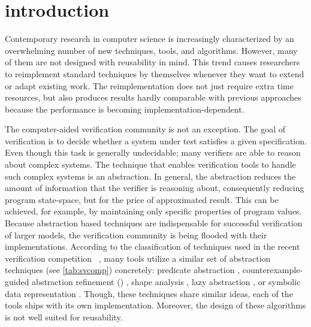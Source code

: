 \chapter{introduction}
\label{ch:intro}


Contemporary research in computer science is increasingly characterized by
an overwhelming number of new techniques, tools, and algorithms.  However, many
of them are not designed with reusability in mind.  This trend causes
researchers to reimplement standard techniques by themselves whenever they want
to extend or adapt existing work.  The reimplementation does not just require
extra time resources, but also produces results hardly comparable with previous
approaches because the performance is becoming implementation-dependent.

The computer-aided verification community is not an exception. The goal of
verification is to decide whether a system under test satisfies a given
specification. Even though this task is generally undecidable; many verifiers
are able to reason about complex systems. The technique that enables
verification tools to handle such complex systems is an abstraction. In
general, the abstraction reduces the amount of information that the verifier is
reasoning about, consequently reducing program state-space, but for the price
of approximated result. This can be achieved, for example, by maintaining only
specific properties of program values. Because abstraction based techniques are
indispensable for successful verification of larger models, the verification
community is being flooded with their implementations.  According to
the classification of techniques used in the recent verification competition
\svcomp~\cite{SVCOMP2019}, many tools utilize a similar set of abstraction
techniques (see \autoref{tab:svcomp}) concretely: predicate abstraction
\cite{Flanagan02},  coun\-ter\-example-guided abstraction refinement (\cegar)
\cite{Clarke20}, shape analysis \cite{Yang2008}, lazy abstraction
\cite{Henzinger2002}, or symbolic data representation
\cite{King76,Burch1990,Majumdar2018}. Though, these techniques share similar
ideas, each of the tools ships with its own implementation.  Moreover, the
design of these algorithms is not well suited for reusability.

